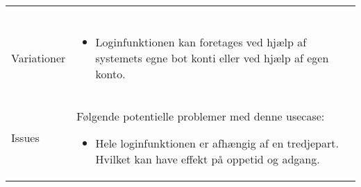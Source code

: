\begin{tabular}{@{}p{3.5cm}@{}p{13cm}@{}}
\begin{enumerate}
\begin{enumerate}
\begin{enumerate}
                \end{enumerate}
        \end{enumerate}
    \end{enumerate} \\
    Variationer & 
    \begin{itemize}
        \item Loginfunktionen kan foretages ved hjælp af systemets egne bot konti eller ved hjælp af egen konto.
    \end{itemize} \\
    Issues &
    Følgende potentielle problemer med denne usecase:
    \begin{itemize}
        \item Hele loginfunktionen er afhængig af en tredjepart. Hvilket kan have effekt på oppetid og adgang.
    \end{itemize} \\
\end{tabular}
\newpage
